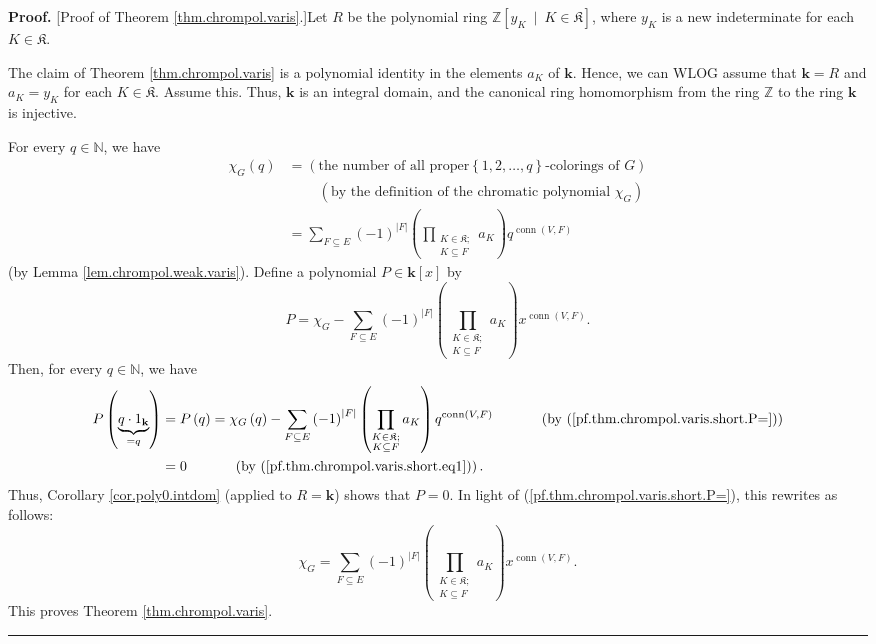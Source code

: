\documentclass[numbers=enddot,12pt,final,onecolumn,notitlepage]{scrartcl}%
\theoremstyle{definition}
\newenvironment{proof}[1][Proof]{\noindent\textbf{#1.} }{\ \rule{0.5em}{0.5em}}
\newenvironment{vershort}{}{}
\let\sumnonlimits\sum
\let\prodnonlimits\prod
\renewcommand{\sum}{\sumnonlimits\limits}
\renewcommand{\prod}{\prodnonlimits\limits}
\begin{document}
\begin{vershort}
\begin{proof}
[Proof of Theorem \ref{thm.chrompol.varis}.]Let $R$ be the polynomial ring
$\mathbb{Z}\left[  y_{K}\ \mid\ K\in\mathfrak{K}\right]  $, where $y_{K}$ is a
new indeterminate for each $K\in\mathfrak{K}$.

The claim of Theorem \ref{thm.chrompol.varis} is a polynomial identity in the
elements $a_{K}$ of $\mathbf{k}$. Hence, we can WLOG assume that
$\mathbf{k}=R$ and $a_{K}=y_{K}$ for each $K\in\mathfrak{K}$. Assume this.
Thus, $\mathbf{k}$ is an integral domain, and the canonical ring homomorphism
from the ring $\mathbb{Z}$ to the ring $\mathbf{k}$ is injective.

For every $q\in\mathbb{N}$, we have%
\begin{align}
\chi_{G}\left(  q\right)   &  =\left(  \text{the number of all proper
}\left\{  1,2,\ldots,q\right\}  \text{-colorings of }G\right) \nonumber\\
&  \ \ \ \ \ \ \ \ \ \ \left(  \text{by the definition of the chromatic
polynomial }\chi_{G}\right) \nonumber\\
&  =\sum_{F\subseteq E}\left(  -1\right)  ^{\left\vert F\right\vert }\left(
\prod_{\substack{K\in\mathfrak{K};\\K\subseteq F}}a_{K}\right)
q^{\operatorname*{conn}\left(  V,F\right)  }
\label{pf.thm.chrompol.varis.short.eq1}%
\end{align}
(by Lemma \ref{lem.chrompol.weak.varis}). Define a polynomial $P\in
\mathbf{k}\left[  x\right]  $ by%
\begin{equation}
P=\chi_{G}-\sum_{F\subseteq E}\left(  -1\right)  ^{\left\vert F\right\vert
}\left(  \prod_{\substack{K\in\mathfrak{K};\\K\subseteq F}}a_{K}\right)
x^{\operatorname*{conn}\left(  V,F\right)  }.
\label{pf.thm.chrompol.varis.short.P=}%
\end{equation}
Then, for every $q\in\mathbb{N}$, we have%
\begin{align*}
P\left(  \underbrace{q\cdot1_{\mathbf{k}}}_{=q}\right)   &  =P\left(
q\right)  =\chi_{G}\left(  q\right)  -\sum_{F\subseteq E}\left(  -1\right)
^{\left\vert F\right\vert }\left(  \prod_{\substack{K\in\mathfrak{K}%
;\\K\subseteq F}}a_{K}\right)  q^{\operatorname*{conn}\left(  V,F\right)
}\ \ \ \ \ \ \ \ \ \ \left(  \text{by (\ref{pf.thm.chrompol.varis.short.P=}%
)}\right) \\
&  =0\ \ \ \ \ \ \ \ \ \ \left(  \text{by
(\ref{pf.thm.chrompol.varis.short.eq1})}\right)  .
\end{align*}
Thus, Corollary \ref{cor.poly0.intdom} (applied to $R=\mathbf{k}$) shows that
$P=0$. In light of (\ref{pf.thm.chrompol.varis.short.P=}), this rewrites as
follows:%
\[
\chi_{G}=\sum_{F\subseteq E}\left(  -1\right)  ^{\left\vert F\right\vert
}\left(  \prod_{\substack{K\in\mathfrak{K};\\K\subseteq F}}a_{K}\right)
x^{\operatorname*{conn}\left(  V,F\right)  }.
\]
This proves Theorem \ref{thm.chrompol.varis}.
\end{proof}
\end{vershort}
\end{document}
